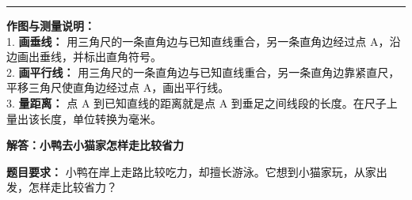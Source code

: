 \vspace{1.0cm}
\hrule
\vspace{0.4cm}

{\small
\textbf{作图与测量说明：} \\
1. \textbf{画垂线：} 用三角尺的一条直角边与已知直线重合，另一条直角边经过点 A，沿边画出垂线，并标出直角符号。 \\
2. \textbf{画平行线：} 用三角尺的一条直角边与已知直线重合，另一条直角边靠紧直尺，平移三角尺使直角边经过点 A，画出平行线。 \\
3. \textbf{量距离：} 点 A 到已知直线的距离就是点 A 到垂足之间线段的长度。在尺子上量出该长度，单位转换为毫米。
}




\newpage

\begin{center}
  {\large\bfseries 解答：小鸭去小猫家怎样走比较省力}
\end{center}

\vspace{0.6cm}

\noindent
{\small \textbf{题目要求：} 小鸭在岸上走路比较吃力，却擅长游泳。它想到小猫家玩，从家出发，怎样走比较省力？}

\vspace{0.8cm}

